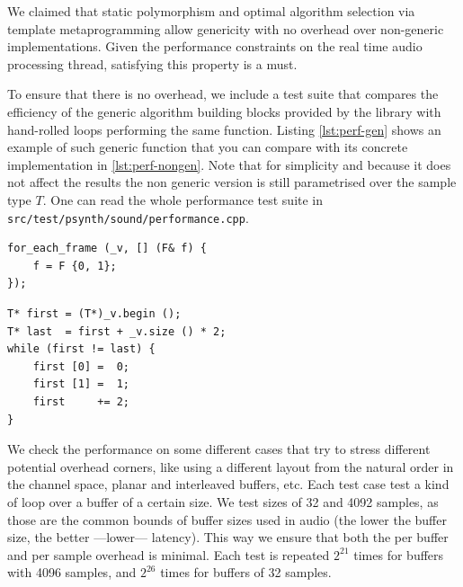 We claimed that static polymorphism and optimal algorithm selection
via template metaprogramming allow genericity with no overhead over
non-generic implementations. Given the performance constraints on the
real time audio processing thread, satisfying this property is a must.

To ensure that there is no overhead, we include a test suite that
compares the efficiency of the generic algorithm building blocks
provided by the library with hand-rolled loops performing the same
function. Listing \ref{lst:perf-gen} shows an example of such generic
function that you can compare with its concrete implementation in
\ref{lst:perf-nongen}. Note that for simplicity and because it does
not affect the results the non generic version is still parametrised
over the sample type $T$. One can read the whole performance test
suite in \texttt{src/test/psynth/sound/performance.cpp}.

\begin{lstlisting}[float=h,
  caption={Generic \texttt{for\_each} that asigns $(0,1)$ to every
  frame over non interleaved data},
  label=lst:perf-gen]
for_each_frame (_v, [] (F& f) { 
    f = F {0, 1};
});
\end{lstlisting}

\begin{lstlisting}[float=h,
  caption={Non generic \texttt{for\_each} that asigns $(0,1)$ to every
  frame over non interleaved data},
  label=lst:perf-nongen]
T* first = (T*)_v.begin ();
T* last  = first + _v.size () * 2;
while (first != last) {
    first [0] =  0;
    first [1] =  1;
    first     += 2;
}
\end{lstlisting}

We check the performance on some different cases that try to stress
different potential overhead corners, like using a different layout
from the natural order in the channel space, planar and interleaved
buffers, etc. Each test case test a kind of loop over a buffer of a
certain size. We test sizes of 32 and 4092 samples, as those are the
common bounds of buffer sizes used in audio (the lower the buffer
size, the better ---lower--- latency). This way we ensure that both
the per buffer and per sample overhead is minimal. Each test is
repeated $2^{21}$ times for buffers with 4096 samples, and $2^{26}$
times for buffers of 32 samples.

